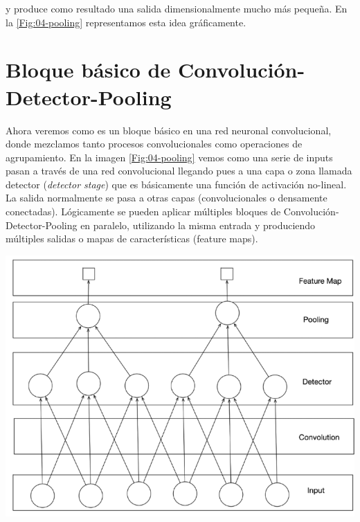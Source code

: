 y produce como resultado una salida dimensionalmente mucho más pequeña. En la \cref{Fig:04-pooling} representamos esta idea gráficamente. 

\section{Bloque básico de Convolución-Detector-Pooling}



\begin{minipage}{0.5\linewidth}
    
Ahora veremos como es un bloque básico en una red neuronal convolucional, donde mezclamos tanto procesos convolucionales como operaciones de agrupamiento. En la imagen \cref{Fig:04-pooling} vemos como una serie de inputs pasan a través de una red convolucional llegando pues a una capa o zona llamada detector (\textit{detector stage}) que es básicamente una función de activación no-lineal. La salida normalmente se pasa a otras capas (convolucionales o densamente conectadas). Lógicamente se pueden aplicar múltiples bloques de Convolución-Detector-Pooling en paralelo, utilizando la misma entrada y produciendo múltiples salidas o mapas de características (feature maps).

\end{minipage} \hfill
\begin{minipage}{0.45\linewidth}
    \includegraphics[width=1\linewidth]{Imagenes/04/PoolingBlock.png}  
    \label{Fig:04-poolingBlock}
\end{minipage}

